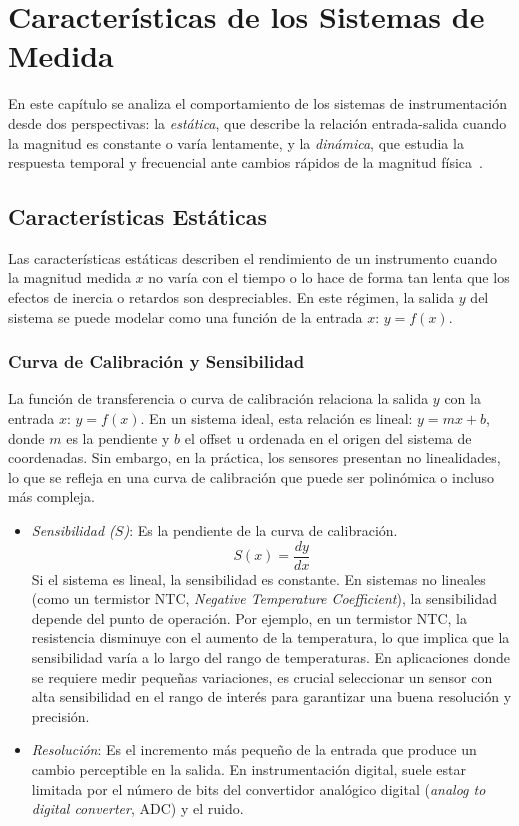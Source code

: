 
\chapter{Características de los Sistemas de Medida}\label{cap:caracteristicas_sistemas_medida}

En este capítulo se analiza el comportamiento de los sistemas de instrumentación desde dos perspectivas: la \emph{estática}, que describe la relación entrada-salida cuando la magnitud es constante o varía lentamente, y la \emph{dinámica}, que estudia la respuesta temporal y frecuencial ante cambios rápidos de la magnitud física~\cite{bentley2004measurement,pallasareny2000sensors}.


\section{Características Estáticas}\label{sec:caract_estaticas}

Las características estáticas describen el rendimiento de un instrumento cuando la magnitud medida $x$ no varía con el tiempo o lo hace de forma tan lenta que los efectos de inercia o retardos son despreciables. En este régimen, la salida $y$ del sistema se puede modelar como una función de la entrada $x$: $y = f(x)$.

\subsection{Curva de Calibración y Sensibilidad}

La función de transferencia o curva de calibración relaciona la salida $y$ con la entrada $x$: $y = f(x)$. En un sistema ideal, esta relación es lineal: $y = mx + b$, donde $m$ es la pendiente y $b$ el offset u ordenada en el origen del sistema de coordenadas. Sin embargo, en la práctica, los sensores presentan no linealidades, lo que se refleja en una curva de calibración que puede ser polinómica o incluso más compleja.

\begin{itemize}
    \item \emph{Sensibilidad ($S$)}: Es la pendiente de la curva de calibración. 
    \[ S(x) = \frac{dy}{dx} \]
    Si el sistema es lineal, la sensibilidad es constante. En sistemas no lineales (como un termistor NTC, \textit{Negative Temperature Coefficient}), la sensibilidad depende del punto de operación. Por ejemplo, en un termistor NTC, la resistencia disminuye con el aumento de la temperatura, lo que implica que la sensibilidad varía a lo largo del rango de temperaturas. En aplicaciones donde se requiere medir pequeñas variaciones, es crucial seleccionar un sensor con alta sensibilidad en el rango de interés para garantizar una buena resolución y precisión.
    \item \emph{Resolución}: Es el incremento más pequeño de la entrada que produce un cambio perceptible en la salida. En instrumentación digital, suele estar limitada por el número de bits del convertidor analógico digital (\textit{analog to digital converter}, ADC) y el ruido.
\end{itemize}

